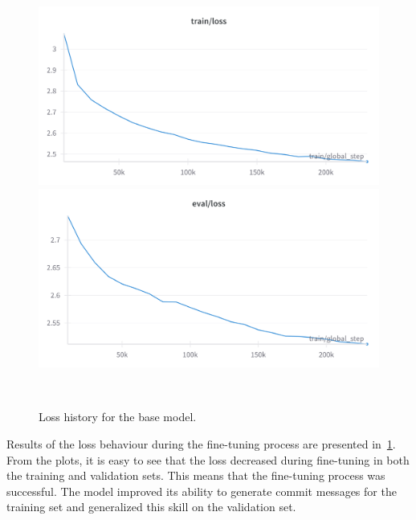 \begin{figure}[H]
    \centering
    \includegraphics[scale=0.15]{figs/train_loss_base.png} \\
    \includegraphics[scale=0.15]{figs/val_loss_base.png}
    \caption{Loss history for the base model.}
    ~\label{fig:base_model_loss}
\end{figure}
Results of the loss behaviour during the fine-tuning process are presented in~\ref{fig:base_model_loss}. From the plots, it is easy to see that the loss decreased during fine-tuning in both the training and validation sets. This means that the fine-tuning process was successful. The model improved its ability to generate commit messages for the training set and generalized this skill on the validation set.

